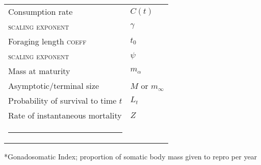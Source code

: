 \documentclass[a4paper]{article} %
\makeatletter
\newcommand{\thickhline}{%
    \noalign {\ifnum 0=`}\fi \hrule height 1pt
    \futurelet \reserved@a \@xhline
}
\makeatother
\begin{document}
\begin{table}[h]
\begin{tabularx}{0.7\linewidth}{ll}
    Consumption rate                                                    & $C(t)$                \\ 
    \textsc{scaling exponent}                                           & $\gamma$              \\ \hline
    Foraging length \textsc{coeff}                                      & $t_0$                 \\
    \textsc{scaling exponent}                                           & $\psi$                \\ \hline
    Mass at maturity                                                    & $m_{\alpha}$          \\ \hline
    Asymptotic/terminal size                                            & $M$ or $m_{\infty}$   \\ \hline
    Probability of survival to time $t$                                 & $L_t$                 \\ \hline
    Rate of instantaneous mortality                                     & $Z$                   \\ \thickhline
    \end{tabularx}
\end{table}

*Gonadosomatic Index; proportion of somatic body mass given to repro per year

\newpage
\end{document}
